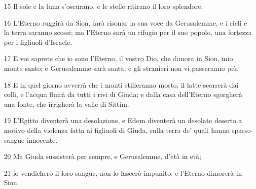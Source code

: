 \par 15 Il sole e la luna s'oscurano, e le stelle ritirano il loro splendore.
\par 16 L'Eterno ruggirà da Sion, farà risonar la sua voce da Gerusalemme, e i cieli e la terra saranno scossi; ma l'Eterno sarà un rifugio per il suo popolo, una fortezza per i figliuoli d'Israele.
\par 17 E voi saprete che io sono l'Eterno, il vostro Dio, che dimora in Sion, mio monte santo; e Gerusalemme sarà santa, e gli stranieri non vi passeranno più.
\par 18 E in quel giorno avverrà che i monti stilleranno mosto, il latte scorrerà dai colli, e l'acqua fluirà da tutti i rivi di Giuda; e dalla casa dell'Eterno sgorgherà una fonte, che irrigherà la valle di Sittim.
\par 19 L'Egitto diventerà una desolazione, e Edom diventerà un desolato deserto a motivo della violenza fatta ai figliuoli di Giuda, sulla terra de' quali hanno sparso sangue innocente.
\par 20 Ma Giuda sussisterà per sempre, e Gerusalemme, d'età in età;
\par 21 io vendicherò il loro sangue, non lo lascerò impunito; e l'Eterno dimorerà in Sion.


